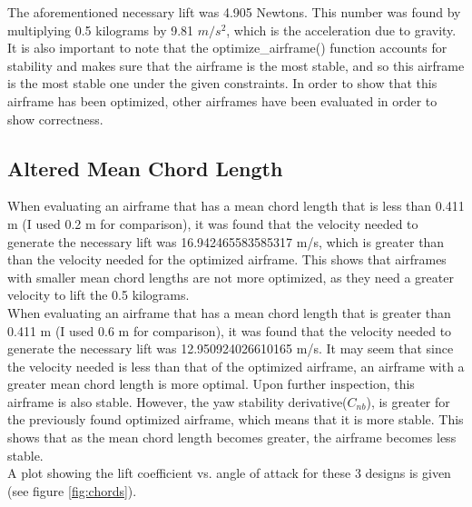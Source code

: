 \documentclass{journal}
\begin{document}
	The aforementioned necessary lift was 4.905 Newtons. This number was found by multiplying 0.5 kilograms by 9.81 \(m/s^2\), which is the acceleration due to gravity. It is also important to note that the optimize\_airframe() function accounts for stability and makes sure that the airframe is the most stable, and so this airframe is the most stable one under the given constraints. In order to show that this airframe has been optimized, other airframes have been evaluated in order to show correctness.\\
	
	\subsection{Altered Mean Chord Length}

	When evaluating an airframe that has a mean chord length that is less than 0.411 m (I used 0.2 m for comparison), it was found that the velocity needed to generate the necessary lift was 16.942465583585317 m/s, which is greater than than the velocity needed for the optimized airframe. This shows that airframes with smaller mean chord lengths are not more optimized, as they need a greater velocity to lift the 0.5 kilograms.\\
	
	When evaluating an airframe that has a mean chord length that is greater than 0.411 m (I used 0.6 m for comparison), it was found that the velocity needed to generate the necessary lift was 12.950924026610165 m/s. It may seem that since the velocity needed is less than that of the optimized airframe, an airframe with a greater mean chord length is more optimal. Upon further inspection, this airframe is also stable. However, the yaw stability derivative(\(C_{nb}\)), is greater for the previously found optimized airframe, which means that it is more stable. This shows that as the mean chord length becomes greater, the airframe becomes less stable.\\
	
	A plot showing the lift coefficient vs. angle of attack for these 3 designs is given (see figure \ref{fig:chords}).
	
\end{document}
